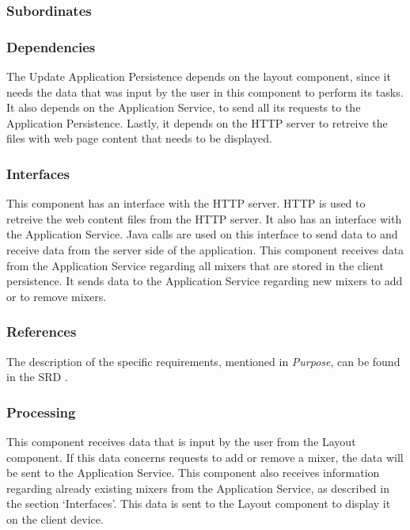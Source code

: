 \subsubsection*{Subordinates}

\subsubsection*{Dependencies}
The Update Application Persistence depends on the layout component, since it needs the data that was input by the user in this component to perform its tasks. It also depends on the Application Service, to send all its requests to the Application Persistence. Lastly, it depends on the HTTP server to retreive the files with web page content that needs to be displayed.

\subsubsection*{Interfaces}
This component has an interface with the HTTP server. HTTP is used to retreive the web content files from the HTTP server. It also has an interface with the Application Service. Java calls are used on this interface to send data to and receive data from the server side of the application. This component receives data from the Application Service regarding all mixers that are stored in the client persistence. It sends data to the Application Service regarding new mixers to add or to remove mixers.

\subsubsection*{References}
The description of the specific requirements, mentioned in \emph{Purpose}, can be found in the SRD \cite{srd}.

\subsubsection*{Processing}
This component receives data that is input by the user from the Layout component. If this data concerns requests to add or remove a mixer, the data will be sent to the Application Service. This component also receives information regarding already existing mixers from the Application Service, as described in the section `Interfaces'. This data is sent to the Layout component to display it on the client device.


